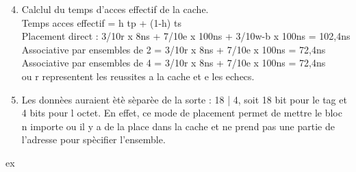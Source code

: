 \documentclass{article}
\begin{document}
\begin{enumerate}
	\setcounter{enumi}{3}
	\item  Calclul du temps d'acces effectif de la cache. \\
	      Temps acces effectif = h tp + (1-h)  ts \\
	      Placement direct : 3/10r x 8ns + 7/10e x 100ns + 3/10w-b x 100ns = 102,4ns \\
	      Associative par ensembles de 2 = 3/10r x 8ns + 7/10e x 100ns = 72,4ns \\
	      Associative par ensembles de 4 = 3/10r x 8ns + 7/10e x 100ns = 72,4ns \\
	      ou r representent les reussites a la cache et e les echecs. \\

	\item  Les donn\`ees auraient \`et\`e s\`epar\`ee de la sorte : 18 | 4, soit 18 bit pour le tag et
	      4 bits pour l octet. En effet, ce mode de placement permet de mettre le bloc n importe ou
	      il y a de la place dans la cache et ne prend pas une partie de l'adresse pour sp\`ecifier l'ensemble.

\end{enumerate}
ex
\end{document}
